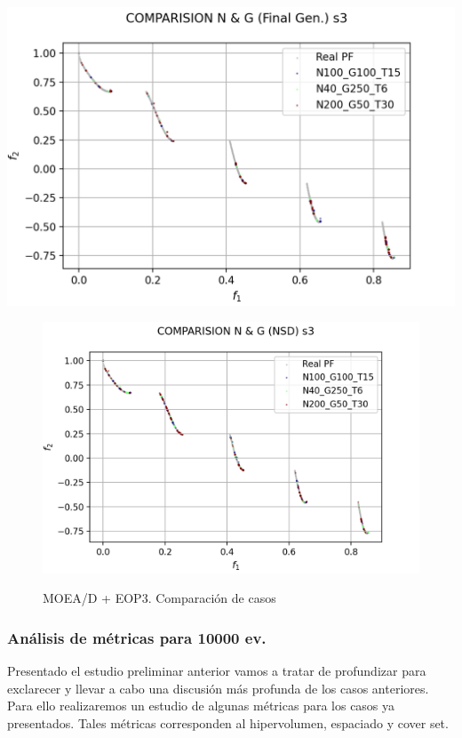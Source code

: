 \begin{center}
\includegraphics[scale=0.8]{figures/COMPARISIONS_EOP3/GCOMP_FGEN_s3.png}\\
\end{center}
\begin{figure}[H]
\centering
\includegraphics[scale=0.8]{figures/COMPARISIONS_EOP3/GCOMP_NDS_s3.png}\\
\caption{MOEA/D + EOP3. Comparación de casos}
\label{fig:21}
\end{figure}



\subsubsection{Análisis de métricas para 10000 ev.}

Presentado el estudio preliminar anterior vamos a tratar de profundizar para exclarecer y llevar a cabo una discusión más profunda de los casos anteriores. Para ello realizaremos un estudio de algunas métricas para los casos ya presentados. Tales métricas corresponden al hipervolumen, espaciado y cover set.\\

